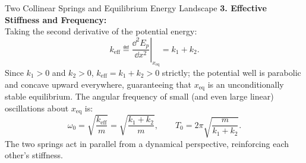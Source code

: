 \begin{workedexample}{Two Collinear Springs and Equilibrium Energy Landscape}
\textbf{3. Effective Stiffness and Frequency:}\\
Taking the second derivative of the potential energy:
\[
k_{\text{eff}} \eqdef \left.\frac{\dd^2 E_p}{\dd x^2}\right|_{x_{\text{eq}}} = k_1 + k_2.
\]
Since $k_1 > 0$ and $k_2 > 0$, $k_{\text{eff}} = k_1 + k_2 > 0$ strictly; the potential well is parabolic and concave upward everywhere, guaranteeing that $x_{\text{eq}}$ is an unconditionally stable equilibrium.
The angular frequency of small (and even large linear) oscillations about $x_{\text{eq}}$ is:
\[
\omega_0 = \sqrt{\frac{k_{\text{eff}}}{m}} = \sqrt{\frac{k_1 + k_2}{m}}, \qquad T_0 = 2\pi\sqrt{\frac{m}{k_1 + k_2}}.
\]
The two springs act in parallel from a dynamical perspective, reinforcing each other's stiffness.
\end{workedexample}

